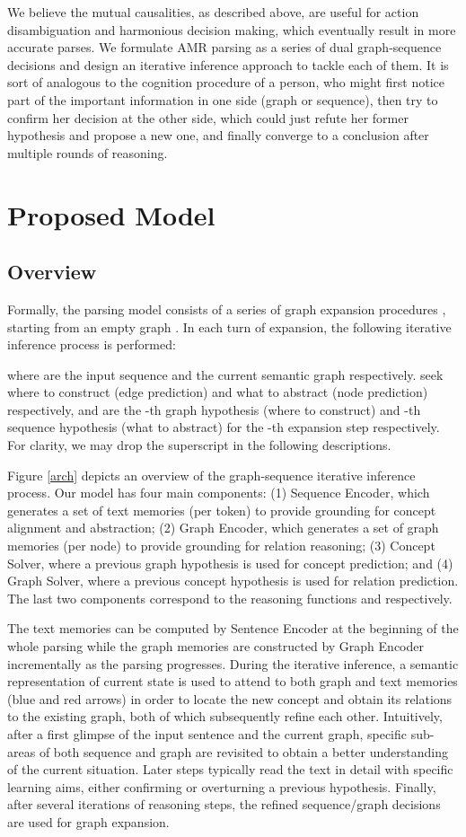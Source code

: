 \documentclass[11pt,a4paper]{article}
\begin{document}
	We believe the mutual causalities, as described above, are useful for action disambiguation and harmonious decision making, which eventually result in more accurate parses. We formulate AMR parsing as a series of dual graph-sequence decisions and design an iterative inference approach to tackle each of them. It is sort of analogous to the cognition procedure of a person, who might first notice part of the important information in one side (graph or sequence), then try to confirm her decision at the other side, which could just refute her former hypothesis and propose a new one, and finally converge to a conclusion after multiple rounds of reasoning.
	\section{Proposed Model}
	\subsection{Overview}
	Formally, the parsing model consists of a series of graph expansion procedures , starting from an empty graph . In each turn of expansion, the following iterative inference process is performed:
	
	where  are the input sequence and the current semantic graph respectively.  seek where to construct (edge prediction) and what to abstract (node prediction) respectively, and  are the -th graph hypothesis (where to construct) and -th sequence hypothesis (what to abstract) for the -th expansion step respectively. For clarity, we may drop the superscript  in the following descriptions.
	
	Figure \ref{arch} depicts an overview of the graph-sequence iterative inference process. Our model has four main components:  (1) Sequence Encoder, which generates a set of text memories (per token) to provide grounding for concept alignment and abstraction; (2) Graph Encoder, which generates a set of graph memories (per node) to provide grounding for relation reasoning; (3) Concept Solver, where a previous graph hypothesis is used for concept prediction; and (4) Graph Solver, where a previous concept hypothesis is used for relation prediction. The last two components correspond to the reasoning functions  and  respectively.
	
	The text memories can be computed by Sentence Encoder at the beginning of the whole parsing while the graph memories are constructed by Graph Encoder incrementally as the parsing progresses. During the iterative inference, a semantic representation of current state is used to attend to both graph and text memories (blue and red arrows) in order to locate the new concept and obtain its relations to the existing graph, both of which subsequently refine each other. Intuitively, after a first glimpse of the input sentence and the current graph, specific sub-areas of both sequence and graph are revisited to obtain a better understanding of the current situation. Later steps typically read the text in detail with specific learning aims, either confirming or overturning a previous hypothesis. Finally, after several iterations of reasoning steps, the refined sequence/graph decisions are used for graph expansion.
\end{document}

